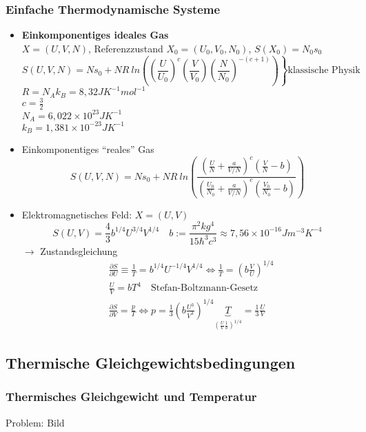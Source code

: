\documentclass[10pt,article,colorback,accentcolor=tud9d]{scrartcl}
\begin{document}
\begin{fleqn}
\subsubsection{Einfache Thermodynamische Systeme}
\begin{itemize}
  \item \textbf{Einkomponentiges ideales Gas}\\
   $X=(U,V,N)$, Referenzzustand $X_0=(U_0,V_0,N_0)$, $S(X_0)=N_0s_0$
   \begin{equation}
   S(U,V,N)=Ns_0 +NR \ ln\left(\left.\left(\frac{U}{U_0}\right)^c\left(\frac{V}{V_0}\right)\left(\frac{N}{N_0}\right)^{-(c+1)}\right)\right\} \text{klassische Physik}
   \end{equation}
   $R=N_Ak_B=8,32JK^{-1}mol^{-1}$\\
   $c= \frac{3}{2}$\\
   $N_A=6,022 \times 10^{23}JK^{-1}$\\
   $k_B=1,381 \times 10^{-23}JK^{-1}$\\
  \item Einkomponentiges ``reales'' Gas
   \begin{equation}
   S(U,V,N)=Ns_0 + NR \ ln \left(\frac{\left(\frac{U}{N}+\frac{a}{V/N}\right)^c\left(\frac{V}{N} -b\right)}{\left(\frac{U_0}{N_0} + \frac{a}{V/N}\right)^c \left(\frac{V_0}{N_0}-b\right)}\right)
   \end{equation}
  \item Elektromagnetisches Feld: $X=(U,V)$\\
   \begin{equation}
    S(U,V)= \frac{4}{3}b^{1/4} U^{3/4}V^{1/4} \quad b:= \frac{\pi^2kg^4}{15 \hbar^3 c^3} \approx 7,56 \times 10^{-16} Jm^{-3}K^{-4}
    \end{equation}
   $\rightarrow$ Zustandsgleichung
   \begin{equation}
   \begin{aligned}
    &\frac{\partial S}{\partial U} \equiv \frac{1}{T} = b^{1/4} U^{-1/4} V^{1/4} \Leftrightarrow \frac{1}{T}=\left(b\frac{V}{U}\right)^{1/4}\\
    &\frac{U}{V}=bT^4 \quad \text{Stefan-Boltzmann-Gesetz}\\
    &\frac{\partial S }{\partial V}=\frac{p}{T} \Leftrightarrow p=\frac{1}{3}\left(b\frac{U^3}{V^3}\right)^{1/4}\underbrace{T}_{\left(\frac{U}{V}\frac{1}{b}\right)^{1/4}}=\frac{1}{3}\frac{U}{V}
   \end{aligned}
   \end{equation}
\end{itemize}
\subsection{Thermische Gleichgewichtsbedingungen}
\subsubsection{Thermisches Gleichgewicht und Temperatur}
Problem: Bild
\end{fleqn}
\end{document}

